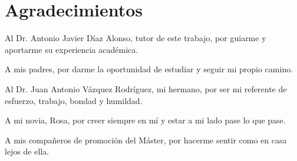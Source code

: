 
\chapter*{Agradecimientos}

Al Dr. Antonio Javier Díaz Alonso, tutor de este trabajo, por guiarme y
aportarme su experiencia académica.

A mis padres, por darme la oportunidad de estudiar y seguir mi propio camino.

Al Dr. Juan Antonio Vázquez Rodríguez, mi hermano, por ser mi referente de
esfuerzo, trabajo, bondad y humildad.

A mi novia, Rosa, por creer siempre en mí y estar a mi lado pase lo que pase.

A mis compañeros de promoción del Máster, por hacerme sentir como en casa lejos
de ella.

\cleardoublepage